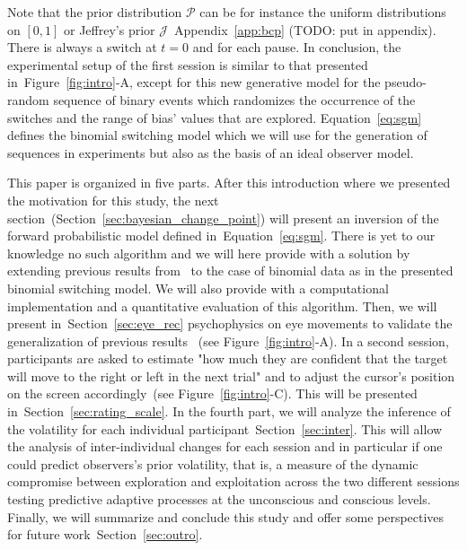 \documentclass[profile,final,english, draft]{article}%
\newcommand{\Jj}{\mathcal{J}}
\newcommand{\Pp}{\mathcal{P}}
\newcommand{\citet}[1]{\textcite{#1}}
\newcommand{\seeFig}[1]{Figure~\ref{fig:#1}}
\newcommand{\seeEq}[1]{Equation~\ref{eq:#1}}
\newcommand{\seeApp}[1]{Appendix~\ref{app:#1}}
\newcommand{\seeSec}[1]{Section~\ref{sec:#1}}
\begin{document}
Note that the prior distribution $\Pp$ can be for instance
the uniform distributions on $ [ 0, 1 ] $ or
Jeffrey's prior $\Jj$~\seeApp{bcp} (TODO: put in appendix).
There is always a switch at $t=0$ and for each pause.
In conclusion, the experimental setup of the first session
is similar to that presented in~\seeFig{intro}-A, except for
this new generative model for the pseudo-random sequence of binary events
which randomizes the occurrence of the switches
and the range of bias' values that are explored.
\seeEq{sgm} defines the binomial switching model which we will use 
for the generation of sequences in experiments
but also as the basis of an ideal observer model.

This paper is organized in five parts.
After this introduction where we presented the motivation for this study, 
the next section~(\seeSec{bayesian_change_point}) will present
an inversion of the forward probabilistic model defined in~\seeEq{sgm}.
There is yet to our knowledge no such algorithm and
we will here provide with a solution
by extending previous results from~\citet{AdamsMackay2007}
to the case of binomial data as in the presented binomial switching model.
We will also provide with a computational implementation
and a quantitative evaluation of this algorithm.
Then, we will present in~\seeSec{eye_rec} psychophysics on eye movements
to validate the generalization of previous results%
~(see \seeFig{intro}-A).
In a second session, participants are asked to estimate
"how much they are confident that
the target will move to the right or left in the next trial" and
to adjust the cursor's position on the screen accordingly~(see \seeFig{intro}-C).
This will be presented in~\seeSec{rating_scale}.
In the fourth part, we will analyze the inference of the volatility
for each individual participant~\seeSec{inter}.
This will allow the analysis of inter-individual changes for each session
and in particular if one could predict observers's prior volatility,
that is, a measure of the dynamic compromise between exploration and exploitation
across the two different sessions testing predictive adaptive processes
at the unconscious and conscious levels.
Finally, we will summarize and conclude this study and
offer some perspectives for future work~\seeSec{outro}.
\end{document}
